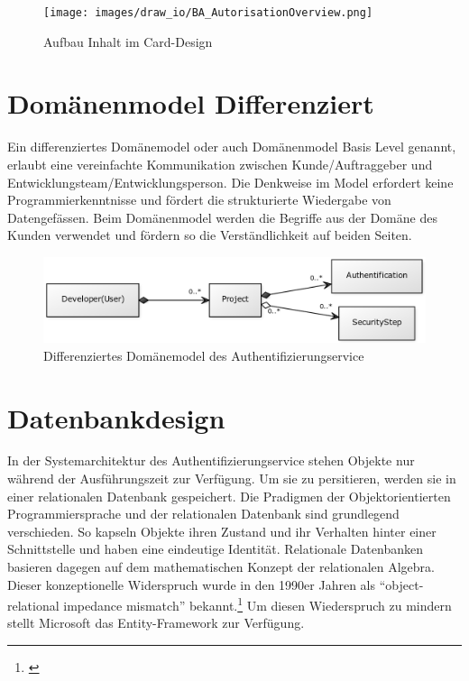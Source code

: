 \begin{figure}[htbp]
\centering
\texttt{[image: images/draw\_io/BA\_AutorisationOverview.png]}
\caption{Aufbau Inhalt im Card-Design}
\end{figure}

\section{Domänenmodel
Differenziert}\label{domuxe4nenmodel-differenziert}

Ein differenziertes Domänemodel oder auch Domänenmodel Basis Level
genannt, erlaubt eine vereinfachte Kommunikation zwischen
Kunde/Auftraggeber und Entwicklungsteam/Entwicklungsperson. Die
Denkweise im Model erfordert keine Programmierkenntnisse und fördert die
strukturierte Wiedergabe von Datengefässen. Beim Domänenmodel werden die
Begriffe aus der Domäne des Kunden verwendet und fördern so die
Verständlichkeit auf beiden Seiten.

\begin{figure}[htbp]
\centering
\includegraphics{images/domaenenmodell.png}
\caption{Differenziertes Domänemodel des Authentifizierungservice}
\end{figure}

\newpage

\section{Datenbankdesign}\label{datenbankdesign}

In der Systemarchitektur des Authentifizierungservice stehen Objekte nur
während der Ausführungszeit zur Verfügung. Um sie zu persitieren, werden
sie in einer relationalen Datenbank gespeichert. Die Pradigmen der
Objektorientierten Programmiersprache und der relationalen Datenbank
sind grundlegend verschieden. So kapseln Objekte ihren Zustand und ihr
Verhalten hinter einer Schnittstelle und haben eine eindeutige
Identität. Relationale Datenbanken basieren dagegen auf dem
mathematischen Konzept der relationalen Algebra. Dieser konzeptionelle
Widerspruch wurde in den 1990er Jahren als ``object-relational impedance
mismatch'' bekannt.\footnote{\autocite{the-vietnam-of-computer-science}}
Um diesen Wiederspruch zu mindern stellt Microsoft das Entity-Framework
zur Verfügung.

